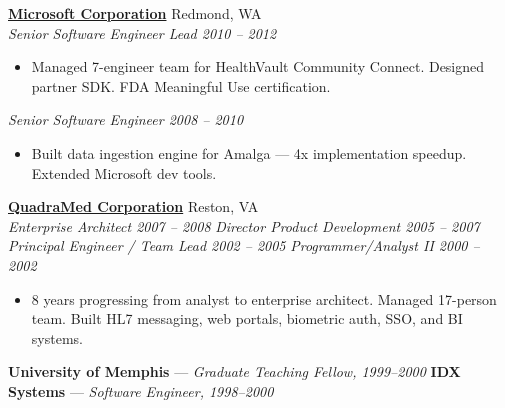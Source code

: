 \documentclass[10pt,letterpaper]{article}
\begin{document}
\textbf{\href{http://www.microsoft.com}{Microsoft Corporation}} \hfill {\small\color{lighttext} Redmond, WA}\\
{\small\itshape\color{accent} Senior Software Engineer Lead \hfill 2010 -- 2012}
\begin{itemize}
\item {\small Managed 7-engineer team for HealthVault Community Connect. Designed partner SDK. FDA Meaningful Use certification.}
\end{itemize}

{\small\itshape\color{accent} Senior Software Engineer \hfill 2008 -- 2010}
\begin{itemize}
\item {\small Built data ingestion engine for Amalga --- 4x implementation speedup. Extended Microsoft dev tools.}
\end{itemize}

\textbf{\href{http://www.quadramed.com/}{QuadraMed Corporation}} \hfill {\small\color{lighttext} Reston, VA}\\
{\small\itshape\color{accent} Enterprise Architect \hfill 2007 -- 2008}
{\small\enspace\textbar\enspace}
{\small\itshape\color{accent} Director Product Development \hfill 2005 -- 2007}
{\small\enspace\textbar\enspace}
{\small\itshape\color{accent} Principal Engineer / Team Lead \hfill 2002 -- 2005}
{\small\enspace\textbar\enspace}
{\small\itshape\color{accent} Programmer/Analyst II \hfill 2000 -- 2002}
\begin{itemize}
\item {\small 8 years progressing from analyst to enterprise architect. Managed 17-person team. Built HL7 messaging, web portals, biometric auth, SSO, and BI systems.}
\end{itemize}

{\small\textbf{University of Memphis} --- \textit{\color{accent}Graduate Teaching Fellow, 1999--2000} \enspace\textbar\enspace \textbf{IDX Systems} --- \textit{\color{accent}Software Engineer, 1998--2000}}
\end{document}
